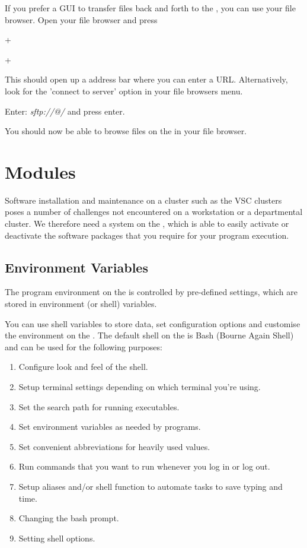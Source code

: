   If you prefer a GUI to transfer files back and forth to the \hpc, you can use your file browser.
  Open your file browser  and press

  \iflinux
     + 
  \fi

  \ifmac
     + 
  \fi

  This should open up a address bar where you can enter a URL. Alternatively, look for the 'connect to server' option in your file browsers menu.

  Enter: \emph{sftp://\userid{}@\loginnode/} and press enter.

  You should now be able to browse files on the \hpc in your file browser.
\fi

\section{Modules}

Software installation and maintenance on a \hpc cluster such as the VSC
clusters poses a number of challenges not encountered on a workstation or a
departmental cluster. We therefore need a system on the \hpc, which is able
to easily activate or deactivate the software packages that you require for
your program execution.

\subsection{Environment Variables}

The program environment on the \hpc is controlled by pre-defined settings,
which are stored in environment (or shell) variables.

You can use shell variables to store data, set configuration options and
customise the environment on the \hpc. The default shell
on the \hpc is Bash (Bourne Again Shell) and can be used for the
following purposes:

\begin{enumerate}
\item  Configure look and feel of the shell.
\item  Setup terminal settings depending on which terminal you're using.
\item  Set the search path for running executables.
\item  Set environment variables as needed by programs.
\item  Set convenient abbreviations for heavily used values.
\item  Run commands that you want to run whenever you log in or log out.
\item  Setup aliases and/or shell function to automate tasks to save typing and time.
\item  Changing the bash prompt.
\item  Setting shell options.
\end{enumerate}

